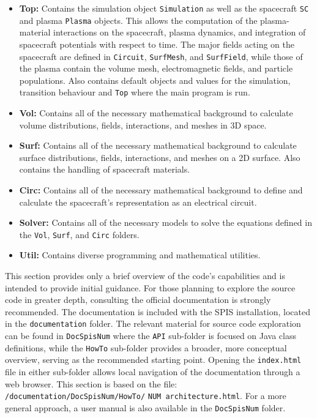 \documentclass[a4paper, 12pt]{article}
\begin{document}
\begin{itemize}
    \item \textbf{Top:} Contains the simulation object \verb|Simulation| as well as the spacecraft \verb|SC| and plasma \verb|Plasma| objects. This allows the computation of the plasma-material interactions on the spacecraft, plasma dynamics, and integration of spacecraft potentials with respect to time. The major fields acting on the spacecraft are defined in \verb|Circuit|, \verb|SurfMesh|, and \verb|SurfField|, while those of the plasma contain the volume mesh, electromagnetic fields, and particle populations. Also contains default objects and values for the simulation, transition behaviour and \verb|Top| where the main program is run.
    \item \textbf{Vol:} Contains all of the necessary mathematical background to calculate volume distributions, fields, interactions, and meshes in 3D space.
    \item \textbf{Surf:} Contains all of the necessary mathematical background to calculate surface distributions, fields, interactions, and meshes on a 2D surface. Also contains the handling of spacecraft materials.
    \item \textbf{Circ:} Contains all of the necessary mathematical background to define and calculate the spacecraft's representation as an electrical circuit.
    \item \textbf{Solver:} Contains all of the necessary models to solve the equations defined in the \verb|Vol|, \verb|Surf|, and \verb|Circ| folders.
    \item \textbf{Util:} Contains diverse programming and mathematical utilities.
\end{itemize}

This section provides only a brief overview of the code's capabilities and is intended to provide initial guidance. For those planning to explore the source code in greater depth, consulting the official documentation is strongly recommended. The documentation is included with the SPIS installation, located in the \verb|documentation| folder. The relevant material for source code exploration can be found in \verb|DocSpisNum| where the \verb|API| sub-folder is focused on Java class definitions, while the \verb|HowTo| sub-folder provides a broader, more conceptual overview, serving as the recommended starting point. Opening the \verb|index.html| file in either sub-folder allows local navigation of the documentation through a web browser. This section is based on the file: \verb|/documentation/DocSpisNum/HowTo/| \verb|NUM architecture.html|. For a more general approach, a user manual is also available in the \verb|DocSpisNum| folder.
\end{document}
